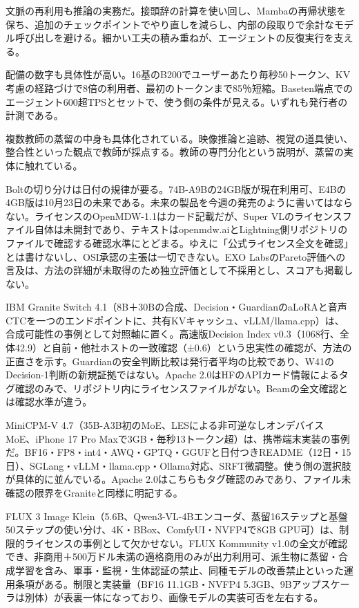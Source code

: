 \documentclass[lualatex,a4paper,10pt]{jlreq}
\begin{document}
文脈の再利用も推論の実務だ。接頭辞の計算を使い回し、Mambaの再帰状態を保ち、追加のチェックポイントでやり直しを減らし、内部の段取りで余計なモデル呼び出しを避ける。細かい工夫の積み重ねが、エージェントの反復実行を支える。
\cite{B21,B72,B22,B20}


配備の数字も具体性が高い。16基のB200でユーザーあたり毎秒50トークン、KV考慮の経路づけで8倍の利用者、最初のトークンまで85％短縮。Baseten端点でのエージェント600超TPSとセットで、使う側の条件が見える。いずれも発行者の計測である。
\cite{B21,B72,B22,B20}


複数教師の蒸留の中身も具体化されている。映像推論と追跡、視覚の道具使い、整合性といった観点で教師が採点する。教師の専門分化という説明が、蒸留の実体に触れている。
\cite{B21,B72,B22,B20}


Boltの切り分けは日付の規律が要る。74B-A9Bの24GB版が現在利用可、E4Bの4GB版は10月23日の未来である。未来の製品を今週の発売のように書いてはならない。ライセンスのOpenMDW-1.1はカード記載だが、Super VLのライセンスファイル自体は未開封であり、テキストはopenmdw.aiとLightning側リポジトリのファイルで確認する確認水準にとどまる。ゆえに「公式ライセンス全文を確認」とは書けないし、OSI承認の主張は一切できない。EXO LabsのPareto評価への言及は、方法の詳細が未取得のため独立評価として不採用とし、スコアも掲載しない。
\cite{B21,B72,B22,B20}


IBM Granite Switch 4.1（8B＋30Bの合成、Decision・GuardianのaLoRAと音声CTCを一つのエンドポイントに、共有KVキャッシュ、vLLM/llama.cpp）は、合成可能性の事例として対照軸に置く。高速版Decision Index v0.3（1068行、全体42.9）と自前・他社ホストの一致確認（±0.6）という忠実性の確認が、方法の正直さを示す。Guardianの安全判断比較は発行者平均の比較であり、W41のDecision-1判断の新規証拠ではない。Apache 2.0はHFのAPIカード情報によるタグ確認のみで、リポジトリ内にライセンスファイルがない。Beamの全文確認とは確認水準が違う。
\cite{B24,B73,B23,B25}


MiniCPM-V 4.7（35B-A3B初のMoE、LESによる非可逆なしオンデバイスMoE、iPhone 17 Pro Maxで3GB・毎秒13トークン超）は、携帯端末実装の事例だ。BF16・FP8・int4・AWQ・GPTQ・GGUFと日付つきREADME（12日・15日）、SGLang・vLLM・llama.cpp・Ollama対応、SRFT微調整。使う側の選択肢が具体的に並んでいる。Apache 2.0はこちらもタグ確認のみであり、ファイル未確認の限界をGraniteと同様に明記する。
\cite{B27,B74,B26}


FLUX 3 Image Klein（5.6B、Qwen3-VL-4Bエンコーダ、蒸留16ステップと基盤50ステップの使い分け、4K・BBox、ComfyUI・NVFP4で8GB GPU可）は、制限的ライセンスの事例として欠かせない。FLUX Kommunity v1.0の全文が確認でき、非商用＋500万ドル未満の適格商用のみが出力利用可、派生物に蒸留・合成学習を含み、軍事・監視・生体認証の禁止、同種モデルの改善禁止といった運用条項がある。制限と実装量（BF16 11.1GB・NVFP4 5.3GB、9Bアップスケーラは別体）が表裏一体になっており、画像モデルの実装可否を左右する。
\cite{B29,B28,B30}
\end{document}
